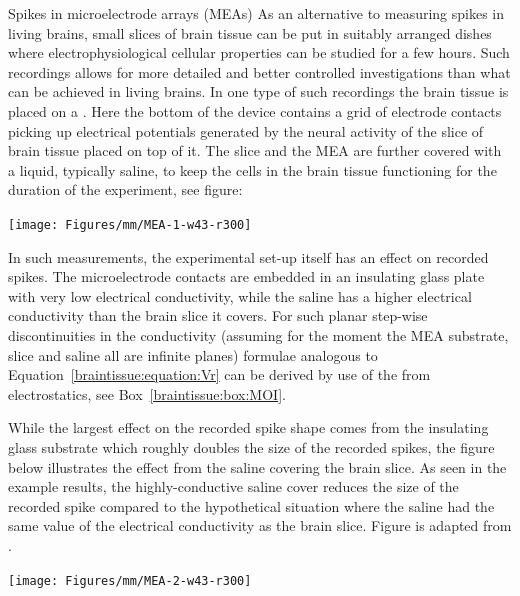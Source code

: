 \begin{boxfloat}{Spikes in microelectrode arrays (MEAs)}
  \label{mm:box:spike-MEA}
As an alternative to measuring spikes in living brains, small slices of brain tissue can be put in suitably arranged dishes
where electrophysiological cellular properties can be studied for a few hours. Such  recordings
allows for more detailed and better controlled investigations than what can be achieved in living brains. In one type of such recordings
the brain tissue is placed on a . Here the bottom of the device contains a grid of electrode
contacts picking up electrical potentials generated by the neural activity of the slice of  brain tissue placed on top of it. 
The slice and the MEA are further covered with a liquid, typically saline, to keep the cells in the brain tissue functioning for the duration
of the experiment,  see figure:

%
\centerline{\texttt{[image: Figures/mm/MEA-1-w43-r300]}}\vspace*{6pt}
%
In such measurements, the experimental set-up itself has an effect on recorded spikes. The microelectrode contacts are 
embedded in an insulating glass plate with very low electrical conductivity, while the saline has
a higher electrical conductivity than the brain slice it covers. 
For such planar step-wise discontinuities in the conductivity (assuming for the moment the MEA substrate, slice and saline
all are infinite planes) formulae analogous to Equation~\ref{braintissue:equation:Vr} can be derived by use of the
 from electrostatics, see Box~\ref{braintissue:box:MOI}.

While the largest effect on the recorded spike shape comes from the insulating 
glass substrate which roughly doubles the size of the recorded spikes, the figure below illustrates the 
effect from the saline covering the brain slice. As seen in the example results, the highly-conductive 
saline cover reduces the size of the recorded spike compared to the hypothetical 
situation where the saline had the same value of the electrical conductivity as the brain slice.
Figure is adapted from \citet{ness2015}.
%
\centerline{\texttt{[image: Figures/mm/MEA-2-w43-r300]}}\vspace*{6pt}
%
\end{boxfloat}



